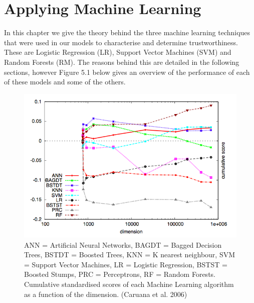 \chapter{Applying Machine Learning}
In this chapter we give the theory behind the three machine learning techniques that were used in our models to characterise and determine trustworthiness. These are Logistic Regression (LR), Support Vector Machines (SVM) and Random Forests (RM). The reasons behind this are detailed in the following sections, however Figure 5.1 below gives an overview of the performance of each of these models and some of the others.                                                          
\begin{figure}[hb]
  \centering
\includegraphics[width=13cm]{MachineLearningModels}
  \caption[Comparison of Machine Learning Models]
   {ANN = Artificial Neural Networks, BAGDT = Bagged Decision Trees, BSTDT = Boosted Trees, KNN = K nearest neighbour, SVM = Support Vector Machines, LR = Logistic Regression, BSTST = Boosted Stumps, PRC = Perceptrons, RF = Random Forests. Cumulative standardised scores of each Machine Learning algorithm as a function of the dimension. (Caruana et al. 2006) }
\end{figure}
